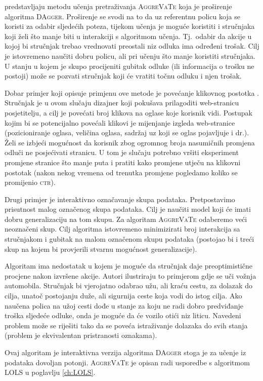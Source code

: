 \citet{ross2011reduction} predstavljaju metodu učenja pretraživanja
\textsc{AggreVaTe}  koja je
proširenje algoritma \textsc{DAgger}. Proširenje se svodi na to da uz referentnu
policu koja se koristi za odabir sljedećih poteza, tijekom učenja je moguće
koristiti i stručnjaka koji želi što manje biti u interakciji s algoritmom
učenja. Tj.~odabir da akcije u kojoj bi stručnjak trebao vrednovati preostali
niz odluka ima određeni trošak. Cilj je istovremeno naučiti dobru policu, ali
pri učenju što manje koristiti stručnjaka. U stanju u kojem je skupo procijeniti
gubitak odluke (ili informacija o trošku ne postoji) može se pozvati stručnjak
koji će vratiti točnu odluku i njen trošak.

Dobar primjer koji opisuje primjenu ove metode je povećanje klikovnog postotka
. Stručnjak je u ovom slučaju dizajner koji
pokušava prilagoditi web-stranicu posjetitelju, a cilj je povećati broj klikova
na oglase koje korisnik vidi. Postupak kojim bi se potencijalno povećali klikovi
je mijenjanje izgleda web-stranice (pozicioniranje oglasa, veličina oglasa,
sadržaj uz koji se oglas pojavljuje i dr.). Želi se izbjeći mogućnost da
korisnik zbog ogromnog broja nasumičnih promjena odluči ne posjećivati stranicu.
U tom je slučaju potrebno vršiti eksperiment promjene stranice što manje puta i
pratiti kako promjene utječu na klikovni postotak (nakon nekog vremena od
trenutka promjene pogledamo koliko se promijenio \textsc{ctr}).

Drugi primjer je interaktivno označavanje skupa podataka. Pretpostavimo
prisutnost malog označenog skupa podataka. Cilj je naučiti model koji će imati
dobru generalizaciju na tom skupu. Za algoritam \textsc{AggreVaTe} odaberemo
veći neoznačeni skup. Cilj algoritma istovremeno minimizirati broj interakcija
sa stručnjakom i gubitak na malom označenom skupu podataka (postojao bi i treći
skup na kojem bi provjerili stvarnu mogućnost generalizacije).

Algoritam ima nedostatak u kojem je moguće da stručnjak daje preoptimistične
procjene nakon izvršene akcije. Autori ilustriraju to primjerom gdje se uči
vožnja automobila. Stručnjak bi vjerojatno odabrao užu, ali kraću cestu, za
dolazak do cilja, unatoč postojanju duže, ali sigurnija ceste koja vodi do istog
cilja. Ako naučena polica na užoj cesti dođe u stanje za koju ne radi dobro
predviđanje troška sljedeće odluke, onda je moguće da će vozilo otići niz
liticu. Navedeni problem može se riješiti tako da se poveća istraživanje
dolazaka do svih stanja (problem je ekvivalentan pristranosti oznakama).

Ovaj algoritam je interaktivna verzija algoritma \textsc{DAgger} stoga je za
učenje iz podataka dovoljan potonji. \textsc{AggreVaTe} je opisan radi usporedbe
s algoritmom \textsc{LOLS} u poglavlju \ref{ch:LOLS}.
